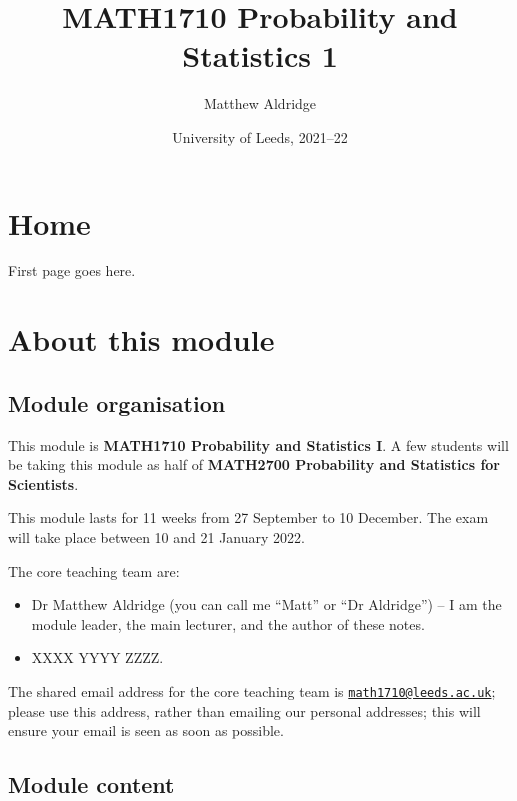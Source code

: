 \documentclass[
  a4paper,
]{book}
\title{MATH1710 Probability and Statistics 1}
\author{Matthew Aldridge}
\date{University of Leeds, 2021--22}
\providecommand{\tightlist}{%
  \setlength{\itemsep}{0pt}\setlength{\parskip}{0pt}}
\theoremstyle{definition}
\theoremstyle{definition}
\theoremstyle{definition}
\theoremstyle{remark}
\begin{document}
\maketitle

{
\setcounter{tocdepth}{1}
\tableofcontents
}
\hypertarget{home}{%
\chapter*{Home}\label{home}}

First page goes here.

\hypertarget{about}{%
\chapter*{About this module}\label{about}}

\hypertarget{organisation}{%
\section*{Module organisation}\label{organisation}}

This module is \textbf{MATH1710 Probability and Statistics I}. A few students will be taking this module as half of \textbf{MATH2700 Probability and Statistics for Scientists}.

This module lasts for 11 weeks from 27 September to 10 December. The exam will take place between 10 and 21 January 2022.

The core teaching team are:

\begin{itemize}
\tightlist
\item
  Dr Matthew Aldridge (you can call me ``Matt'' or ``Dr Aldridge'') -- I am the module leader, the main lecturer, and the author of these notes.
\item
  XXXX YYYY ZZZZ.
\end{itemize}

The shared email address for the core teaching team is \href{mailto:math1710@leeds.ac.uk}{\nolinkurl{math1710@leeds.ac.uk}}; please use this address, rather than emailing our personal addresses; this will ensure your email is seen as soon as possible.

\hypertarget{content}{%
\section*{Module content}\label{content}}
\end{document}
